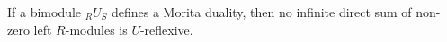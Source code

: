 If a bimodule ${}_R U_S$ defines a Morita duality, then no infinite direct sum of non-zero left $R$-modules is $U$-reflexive.
